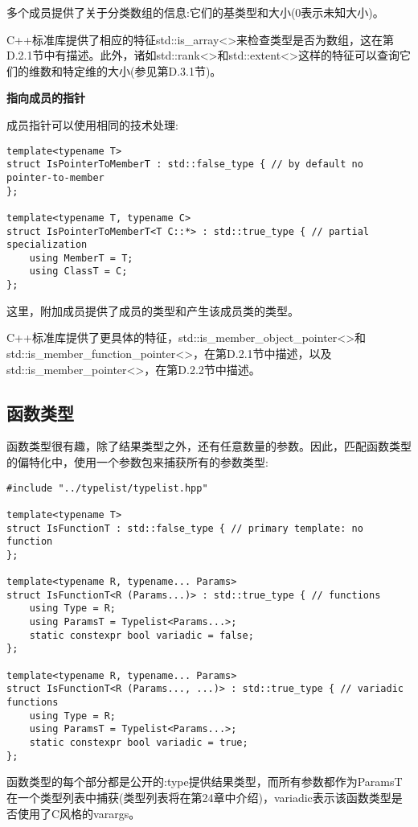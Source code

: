 多个成员提供了关于分类数组的信息:它们的基类型和大小(0表示未知大小)。

C++标准库提供了相应的特征std::is\_array<>来检查类型是否为数组，这在第D.2.1节中有描述。此外，诸如std::rank<>和std::extent<>这样的特征可以查询它们的维数和特定维的大小(参见第D.3.1节)。

\noindent
\textbf{指向成员的指针}

成员指针可以使用相同的技术处理:

\begin{lstlisting}[style=styleCXX]
template<typename T>
struct IsPointerToMemberT : std::false_type { // by default no pointer-to-member
};

template<typename T, typename C>
struct IsPointerToMemberT<T C::*> : std::true_type { // partial specialization
	using MemberT = T;
	using ClassT = C;
};
\end{lstlisting}

这里，附加成员提供了成员的类型和产生该成员类的类型。

C++标准库提供了更具体的特征，std::is\_member\_object\_pointer<>和std::is\_member\_function\_pointer<>，在第D.2.1节中描述，以及std::is\_member\_pointer<>，在第D.2.2节中描述。

\subsection{函数类型}

函数类型很有趣，除了结果类型之外，还有任意数量的参数。因此，匹配函数类型的偏特化中，使用一个参数包来捕获所有的参数类型:

\begin{lstlisting}[style=styleCXX]
#include "../typelist/typelist.hpp"

template<typename T>
struct IsFunctionT : std::false_type { // primary template: no function
};

template<typename R, typename... Params>
struct IsFunctionT<R (Params...)> : std::true_type { // functions
	using Type = R;
	using ParamsT = Typelist<Params...>;
	static constexpr bool variadic = false;
};

template<typename R, typename... Params>
struct IsFunctionT<R (Params..., ...)> : std::true_type { // variadic functions
	using Type = R;
	using ParamsT = Typelist<Params...>;
	static constexpr bool variadic = true;
};
\end{lstlisting}

函数类型的每个部分都是公开的:type提供结果类型，而所有参数都作为ParamsT在一个类型列表中捕获(类型列表将在第24章中介绍)，variadic表示该函数类型是否使用了C风格的varargs。

